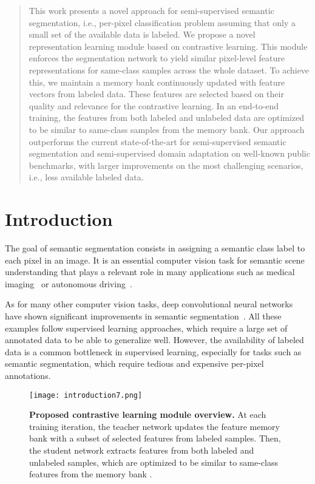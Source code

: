 \documentclass[10pt,twocolumn,letterpaper]{article}
\begin{document}
 
\begin{abstract} 

This work presents a novel approach for semi-supervised semantic segmentation, i.e., per-pixel classification problem assuming that only a small set of the available data is labeled. 
We propose a novel representation learning module based on contrastive learning. This module enforces the segmentation network to yield similar pixel-level feature representations for same-class samples across the whole dataset. 
To achieve this, we maintain a memory bank continuously updated with feature vectors from labeled data. These features are selected based on their quality and relevance for the contrastive learning.
In an end-to-end training, the features from both labeled and unlabeled data are optimized to be similar to same-class samples from the memory bank. 
Our approach outperforms the current state-of-the-art for semi-supervised semantic segmentation and semi-supervised domain adaptation on well-known public benchmarks, with larger improvements on the most challenging scenarios, i.e., less available labeled data.
\end{abstract}


\section{Introduction}

The goal of semantic segmentation consists in assigning a semantic class label to each pixel in an image. It is an essential computer vision task for semantic scene understanding that plays a relevant role in many applications such as medical imaging~\cite{ronneberger2015u} or autonomous driving~\cite{badrinarayanan2017segnet}. 

As for many other computer vision tasks, deep convolutional neural networks have shown significant improvements in semantic segmentation~\cite{badrinarayanan2017segnet, jegou2017one, alonso2020MininetV2}. All these examples follow supervised learning approaches, which require a large set of annotated data to be able to generalize well. However, the availability of labeled data is a common bottleneck in supervised learning, especially for tasks such as semantic segmentation, which require tedious and expensive per-pixel annotations. 

\begin{figure}[!tb]
\centering
\texttt{[image: introduction7.png]}
\caption{
\textbf{Proposed contrastive learning module overview.} At each training iteration, the teacher network  updates the feature memory bank with a subset of selected features from labeled samples.
Then, the student network  extracts features  from both labeled and unlabeled samples, 
which are optimized to be similar to same-class features from the memory bank 
\scriptsize \textbigcircle \small. 
}

\label{fig:introduction}
\end{figure} 
 
\end{document}
